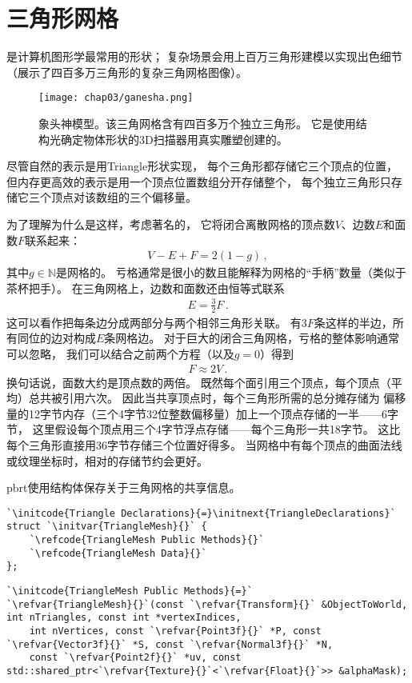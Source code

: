 \section{三角形网格}\label{sec:三角形网格}
是计算机图形学最常用的形状；
复杂场景会用上百万三角形建模以实现出色细节
（展示了四百多万三角形的复杂三角网格图像）。
\begin{figure}[htbp]
    \centering\texttt{[image: chap03/ganesha.png]}
    \caption{象头神模型。该三角网格含有四百多万个独立三角形。
        它是使用结构光确定物体形状的3D扫描器用真实雕塑创建的。}
    \label{fig:3.11}
\end{figure}

尽管自然的表示是用{\ttfamily Triangle}形状实现，
每个三角形都存储它三个顶点的位置，
但内存更高效的表示是用一个顶点位置数组分开存储整个，
每个独立三角形只存储它三个顶点对该数组的三个偏移量。

为了理解为什么是这样，考虑著名的，
它将闭合离散网格的顶点数$V$、边数$E$和面数$F$联系起来：
\begin{align*}
    V-E+F=2(1-g)\, ,
\end{align*}
其中$g\in\mathbb{N}$是网格的。
亏格通常是很小的数且能解释为网格的“手柄”数量（类似于茶杯把手）。
在三角网格上，边数和面数还由恒等式联系
\begin{align*}
    E=\frac{3}{2}F\, .
\end{align*}
这可以看作把每条边分成两部分与两个相邻三角形关联。
有$3F$条这样的半边，所有同位的边对构成$E$条网格边。
对于巨大的闭合三角网格，亏格的整体影响通常可以忽略，
我们可以结合之前两个方程（以及$g=0$）得到
\begin{align*}
    F\approx2V\, .
\end{align*}
换句话说，面数大约是顶点数的两倍。
既然每个面引用三个顶点，每个顶点（平均）总共被引用六次。
因此当共享顶点时，每个三角形所需的总分摊存储为
偏移量的12字节内存（三个4字节32位整数偏移量）加上一个顶点存储的一半——6字节，
这里假设每个顶点用三个4字节浮点存储——每个三角形一共18字节。
这比每个三角形直接用36字节存储三个位置好得多。
当网格中有每个顶点的曲面法线或纹理坐标时，相对的存储节约会更好。

pbrt使用结构体保存关于三角网格的共享信息。
\begin{lstlisting}
`\initcode{Triangle Declarations}{=}\initnext{TriangleDeclarations}`
struct `\initvar{TriangleMesh}{}` {
    `\refcode{TriangleMesh Public Methods}{}`
    `\refcode{TriangleMesh Data}{}`
};
\end{lstlisting}
\begin{lstlisting}
`\initcode{TriangleMesh Public Methods}{=}`
`\refvar{TriangleMesh}{}`(const `\refvar{Transform}{}` &ObjectToWorld, int nTriangles, const int *vertexIndices,
    int nVertices, const `\refvar{Point3f}{}` *P, const `\refvar{Vector3f}{}` *S, const `\refvar{Normal3f}{}` *N,
    const `\refvar{Point2f}{}` *uv, const std::shared_ptr<`\refvar{Texture}{}`<`\refvar{Float}{}`>> &alphaMask);
\end{lstlisting}

